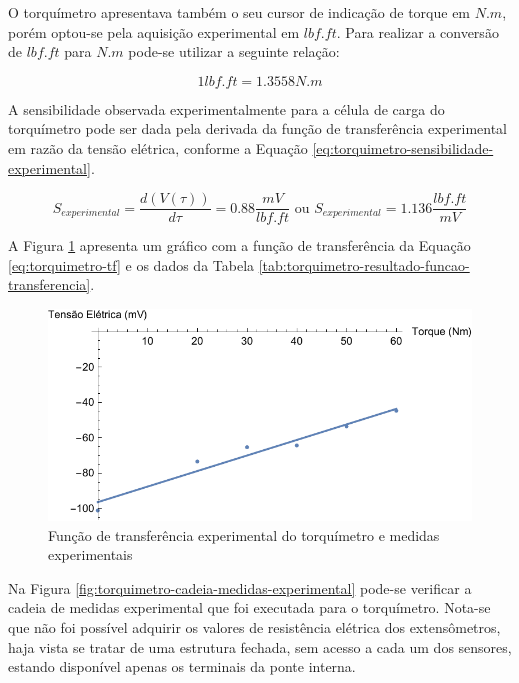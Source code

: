 \documentclass[a4paper]{instrumentacao}
\begin{document}
O torquímetro apresentava também o seu cursor de indicação de torque em $N.m$, porém optou-se pela aquisição experimental em $lbf.ft$. Para realizar a conversão de $lbf.ft$ para $N.m$ pode-se utilizar a seguinte relação:

\begin{equation}
	1 lbf.ft = 1.3558 N.m
	\label{eq:torquimetro-relacao-unidades}
\end{equation}

A sensibilidade observada experimentalmente para a célula de carga do torquímetro pode ser dada pela derivada da função de transferência experimental em razão da tensão elétrica, conforme a Equação \ref{eq:torquimetro-sensibilidade-experimental}.

\begin{equation}
	S_{experimental}=\frac{d (V(\tau))}{d \tau }=0.88\frac{mV}{lbf.ft} \textrm{ ou } S_{experimental}=1.136\frac{lbf.ft}{mV}
	\label{eq:torquimetro-sensibilidade-experimental}
\end{equation}

A Figura \ref{fig:torquimetro-tf} apresenta um gráfico com a função de transferência da Equação \ref{eq:torquimetro-tf} e os dados da Tabela \ref{tab:torquimetro-resultado-funcao-transferencia}.

\begin{figure}[H]
\center
\includegraphics[width=\textwidth]{Torquimetro-Plot.pdf}
\caption{Função de transferência experimental do torquímetro e medidas experimentais}
\label{fig:torquimetro-tf}
\end{figure}

Na Figura \ref{fig:torquimetro-cadeia-medidas-experimental} pode-se verificar a cadeia de medidas experimental que foi executada para o torquímetro. Nota-se que não foi possível adquirir os valores de resistência elétrica dos extensômetros, haja vista se tratar de uma estrutura fechada, sem acesso a cada um dos sensores, estando disponível apenas os terminais da ponte interna.
\end{document}
